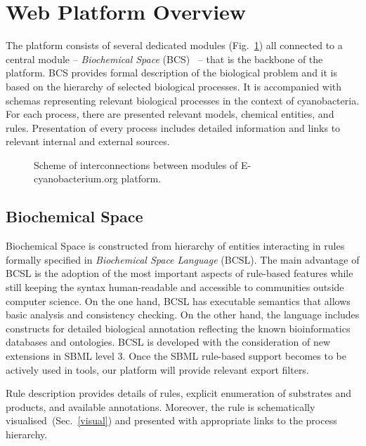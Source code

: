 \documentclass[runningheads]{llncs}
\begin{document}
\section{Web Platform Overview}
The platform consists of several dedicated modules (Fig.~\ref{overview}) all connected to a central module -- \emph{Biochemical Space} (BCS)~\cite{BCS} -- that is the backbone of the platform. BCS provides formal description of the biological problem and it is based on the hierarchy of selected biological processes. It is accompanied with schemas representing relevant biological processes in the context of cyanobacteria. For each process, there are presented relevant models, chemical entities, and rules. Presentation of every process includes detailed information and links to relevant internal and external sources.

\begin{figure}
\begin{center}
\end{center}
\caption{Scheme of interconnections between modules of E-cyanobacterium.org platform.}
\label{overview}
\end{figure}

\enlargethispage*{5mm}

\subsection{Biochemical Space}
\label{detail}
Biochemical Space is constructed from hierarchy of entities interacting in rules formally specified in \emph{Biochemical Space Language} (BCSL). The main advantage of BCSL is the adoption of the most important aspects of rule-based features while still keeping the syntax human-readable and accessible to communities outside computer science. On the one hand, BCSL has executable semantics that allows basic analysis and consistency checking. On the other hand, the language includes constructs for detailed biological annotation reflecting the known bioinformatics databases and ontologies. BCSL is developed with the consideration of new extensions in SBML level 3. Once the SBML rule-based support becomes to be actively used in tools, our platform will provide relevant export filters. 

Rule description provides details of rules, explicit enumeration of substrates and products, and available annotations. Moreover, the rule is schematically visualised~(Sec.~\ref{visual}) and presented with appropriate links to the process hierarchy.
\end{document}
